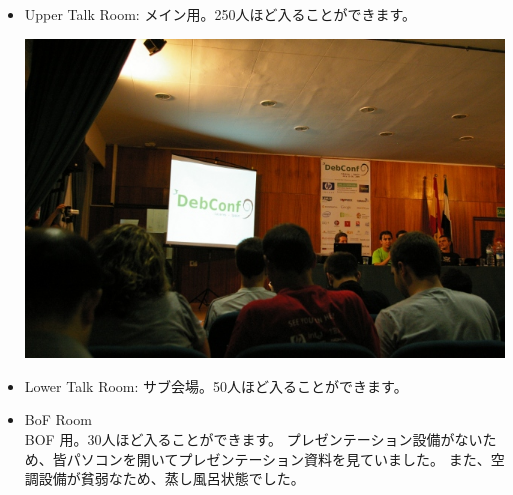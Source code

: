 \documentclass[mingoth,a4paper]{jsarticle}
\begin{document}
\begin{itemize}
  \item Upper Talk Room: 	メイン用。250人ほど入ることができます。\\
	\begin{minipage}{0.4\hsize}
	\includegraphics[width=0.8\hsize]{image200908/debconf9_main.jpg}
	\end{minipage}
  \item Lower Talk Room: サブ会場。50人ほど入ることができます。

  \item BoF Room\\
	BOF 用。30人ほど入ることができます。
        プレゼンテーション設備がないため、皆パソコンを開いてプレゼンテーション資料を見ていました。
	また、空調設備が貧弱なため、蒸し風呂状態でした。


\end{itemize}
\end{document}

